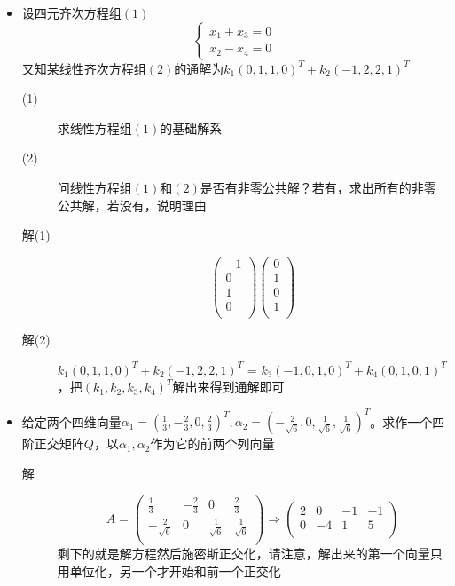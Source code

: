 \begin{itemize}
\item 设四元齐次方程组$(1)$
\[
\begin{cases}
x_1 + x_3 = 0 \\
x_2 - x_4 = 0
\end{cases}
\]
又知某线性齐次方程组$(2)$的通解为$k_1(0,1,1,0)^T+k_2(-1,2,2,1)^T$
\begin{description}
\item[(1)] 求线性方程组$(1)$的基础解系
\item[(2)] 问线性方程组$(1)$和$(2)$是否有非零公共解？若有，求出所有的非零公共解，若没有，说明理由
\item[解(1)]
\[
\left(
\begin{array}{c}
-1 \\
0 \\
1 \\
0 \\
\end{array}
\right) \left(
\begin{array}{c}
0 \\
1 \\
0 \\
1 \\
\end{array}
\right)
\]
\item[解(2)] $k_1(0,1,1,0)^T+k_2(-1,2,2,1)^T$ = $k_3(-1,0,1,0)^T+k_4(0,1,0,1)^T$，把$(k_1,k_2,k_3,k_4)^T$解出来得到通解即可
\end{description}

\item 给定两个四维向量$\alpha_1=(\frac{1}{3},-\frac{2}{3},0,\frac{2}{3})^T,\alpha_2=(-\frac{2}{\sqrt{6}},0,\frac{1}{\sqrt{6}},\frac{1}{\sqrt{6}})^T$。求作一个四阶正交矩阵$Q$，以$\alpha_1,\alpha_2$作为它的前两个列向量
\begin{description}
\item[解]
\[
A = \left(
\begin{array}{cccc}
\frac{1}{3}&-\frac{2}{3}&0&\frac{2}{3}\\
-\frac{2}{\sqrt{6}}&0&\frac{1}{\sqrt{6}}&\frac{1}{\sqrt{6}}\\
\end{array}
\right) \Rightarrow \left(
\begin{array}{cccc}
2&0&-1&-1\\
0&-4&1&5\\
\end{array}
\right)
\]
剩下的就是解方程然后施密斯正交化，请注意，解出来的第一个向量只用单位化，另一个才开始和前一个正交化
\end{description}


\end{itemize}
